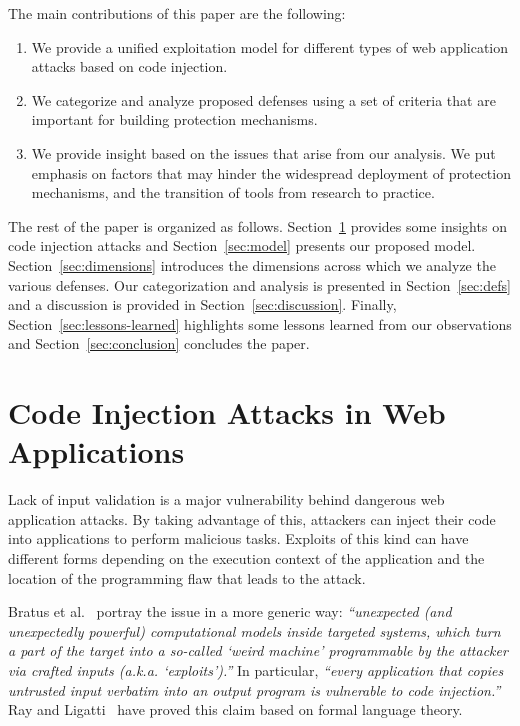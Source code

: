 \documentclass[conference]{IEEEtran}
\begin{document}
The main contributions of this paper are the following:

\begin{enumerate}
\item We provide a unified exploitation model for different types of
  web application attacks based on code injection.
\item We categorize and analyze proposed defenses using a set of
  criteria that are important for building protection mechanisms.
\item We provide insight based on the issues that arise from our analysis. We put
  emphasis on factors that may hinder the widespread deployment of
  protection mechanisms, and the transition of tools from research to practice.
\end{enumerate}

The rest of the paper is organized as follows.
Section~\ref{sec:attacks} provides some insights on
code injection attacks and
Section~\ref{sec:model} presents our proposed model.
Section~\ref{sec:dimensions} introduces the dimensions
across which we analyze the various defenses.
Our categorization and analysis is presented in
Section~\ref{sec:defs} and a discussion is provided in
Section~\ref{sec:discussion}. Finally,
Section~\ref{sec:lessons-learned} highlights
some lessons learned from our observations
and Section~\ref{sec:conclusion} concludes the paper.

\section{Code Injection Attacks in Web Applications}
\label{sec:attacks}

Lack of input validation is a major vulnerability behind dangerous web
application attacks. By taking advantage of this, attackers can inject
their code into applications to perform malicious tasks. Exploits of
this kind can have different forms depending on the execution context
of the application and the location of the programming flaw that leads
to the attack.

Bratus et al.~\cite{BLSPS11} portray the issue in a more generic way:
{\it ``unexpected (and unexpectedly powerful) computational models
  inside targeted systems, which turn a part of the target into a
  so-called `weird machine' programmable by the attacker via crafted
  inputs (a.k.a. `exploits').''} In particular, {\it ``every
  application that copies untrusted input verbatim into an output
  program is vulnerable to code injection.''} Ray and
Ligatti~\cite{RL12b} have proved this claim based on formal language
theory.
\end{document}
